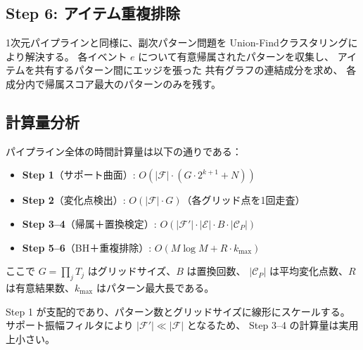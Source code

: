 \subsection{Step 6: アイテム重複排除}

1次元パイプラインと同様に、副次パターン問題を
Union-Findクラスタリングにより解決する。
各イベント $e$ について有意帰属されたパターンを収集し、
アイテムを共有するパターン間にエッジを張った
共有グラフの連結成分を求め、
各成分内で帰属スコア最大のパターンのみを残す。

\subsection{計算量分析}

パイプライン全体の時間計算量は以下の通りである：
\begin{itemize}
\item \textbf{Step 1}（サポート曲面）: $O(|\mathcal{F}| \cdot (G \cdot 2^{k+1} + N))$
\item \textbf{Step 2}（変化点検出）: $O(|\mathcal{F}| \cdot G)$（各グリッド点を1回走査）
\item \textbf{Step 3--4}（帰属＋置換検定）: $O(|\mathcal{F}'| \cdot |\mathcal{E}| \cdot B \cdot |\mathcal{C}_P|)$
\item \textbf{Step 5--6}（BH＋重複排除）: $O(M \log M + R \cdot k_{\max})$
\end{itemize}
ここで $G = \prod_j T_j$ はグリッドサイズ、$B$ は置換回数、
$|\mathcal{C}_P|$ は平均変化点数、$R$ は有意結果数、$k_{\max}$ はパターン最大長である。

Step 1 が支配的であり、パターン数とグリッドサイズに線形にスケールする。
サポート振幅フィルタにより $|\mathcal{F}'| \ll |\mathcal{F}|$ となるため、
Step 3--4 の計算量は実用上小さい。
